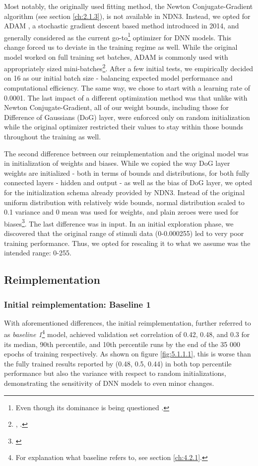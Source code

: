 Most notably, the originally used fitting method, the Newton Conjugate-Gradient algorithm (see section \ref{ch:2.1.3}), is not available in NDN3. Instead, we opted for ADAM \citep{kingma2014adam}, a stochastic gradient descent based method introduced in 2014, and generally considered as the current go-to\footnote{Even though its dominance is being questioned \cite{2019arXiv191005446C}.} optimizer for DNN models. This change forced us to deviate in the training regime as well. While the original model worked on full training set batches, ADAM is commonly used with appropriately sized mini-batches\footnote{\citep{2017arXiv170508741H}, \citep{2017arXiv171100489S}.}. After a few initial tests, we empirically decided on 16 as our initial batch size - balancing expected model performance and computational efficiency. The same way, we chose to start with a learning rate of 0.0001. The last impact of a different optimization method was that unlike with Newton Conjugate-Gradient, all of our weight bounds, including those for Difference of Gaussians (DoG) layer, were enforced only on random initialization while the original optimizer restricted their values to stay within those bounds throughout the training as well.

The second difference between our reimplementation and the original model was in initialization of weights and biases. While we copied the way DoG layer weights are initialized - both in terms of bounds and distributions, for both fully connected layers - hidden and output - as well as the bias of DoG layer, we opted for the initialization schema already provided by NDN3. Instead of the original uniform distribution with relatively wide bounds, normal distribution scaled to 0.1 variance and 0 mean was used for weights, and plain zeroes were used for biases\footnote{\citep{glorot}}. The last difference was in input. In an initial exploration phase, we discovered that the original range of stimuli data (0-0.000255) led to very poor training performance. Thus, we opted for rescaling it to what we assume was the intended range: 0-255.

\subsection{Reimplementation}
\subsubsection{Initial reimplementation: Baseline 1}

With aforementioned differences, the initial reimplementation, further referred to as \emph{baseline 1}\footnote{For explanation what baseline refers to, see section \ref{ch:4.2.1}.} model, achieved validation set correlation of 0.42, 0.48, and 0.3 for its median, 90th percentile, and 10th percentile runs by the end of the 35 000 epochs of training respectively. As shown on figure \ref{fig:5.1.1.1}, this is worse than the fully trained results reported by \citeauthor{antolik} (0.48, 0.5, 0.44) in both top percentile performance but also the variance with respect to random initializations, demonstrating the sensitivity of DNN models to even minor changes.

